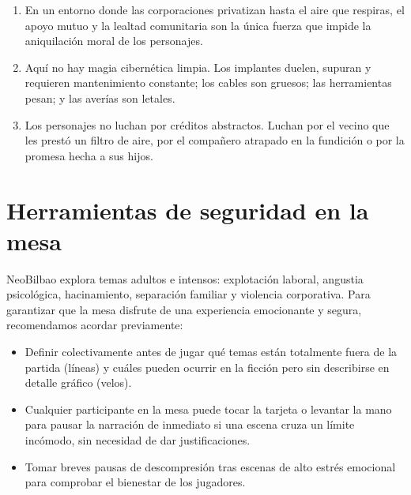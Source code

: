 \begin{enumerate}
  \item {} En un entorno donde las corporaciones privatizan hasta el aire que respiras, el apoyo mutuo y la lealtad comunitaria son la única fuerza que impide la aniquilación moral de los personajes.
  \item {} Aquí no hay magia cibernética limpia. Los implantes duelen, supuran y requieren mantenimiento constante; los cables son gruesos; las herramientas pesan; y las averías son letales.
  \item {} Los personajes no luchan por créditos abstractos. Luchan por el vecino que les prestó un filtro de aire, por el compañero atrapado en la fundición o por la promesa hecha a sus hijos.
\end{enumerate}

\section{Herramientas de seguridad en la mesa}

NeoBilbao explora temas adultos e intensos: explotación laboral, angustia psicológica, hacinamiento, separación familiar y violencia corporativa. Para garantizar que la mesa disfrute de una experiencia emocionante y segura, recomendamos acordar previamente:

\begin{itemize}
  \item {} Definir colectivamente antes de jugar qué temas están totalmente fuera de la partida (líneas) y cuáles pueden ocurrir en la ficción pero sin describirse en detalle gráfico (velos).
  \item {} Cualquier participante en la mesa puede tocar la tarjeta o levantar la mano para pausar la narración de inmediato si una escena cruza un límite incómodo, sin necesidad de dar justificaciones.
  \item {} Tomar breves pausas de descompresión tras escenas de alto estrés emocional para comprobar el bienestar de los jugadores.
\end{itemize}
